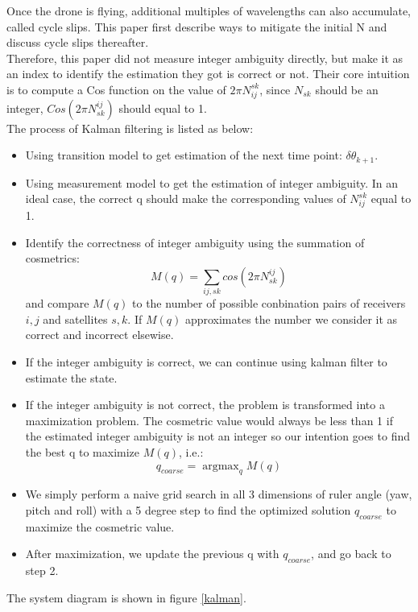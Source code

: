 \documentclass[journal,onecolumn]{IEEEtran}
\DeclareMathOperator*{\argmax}{argmax} %
\begin{document}
Once the drone is flying, additional multiples of wavelengths can also accumulate,
called cycle slips. This paper first describe ways to mitigate the initial N and
discuss cycle slips thereafter.\\
Therefore, this paper did not measure integer ambiguity directly, but make it as an index
to identify the estimation they got is correct or not. Their core intuition is
to compute a Cos function on the value of $2\pi N_{ij}^{sk}$,
since $N_{sk}$ should be an integer, $Cos(2\pi N_{sk}^{ij})$ should equal to 1.\\
The process of Kalman filtering is listed as below:
\begin{itemize}
\item Using transition model to get estimation of the next time point: $\delta \theta_{k+1}$.
\item Using measurement model to get the estimation of integer ambiguity.
In an ideal case, the correct q should make the corresponding values of $N_{ij}^{sk}$
equal to 1.
\item Identify the correctness of integer ambiguity using the summation of cosmetrics:
\begin{equation}
  M(q) = \sum_{ij,sk} cos(2\pi N_{sk}^{ij})
\end{equation}
and compare $M(q)$ to the number of possible conbination pairs of receivers $i,j$ and
satellites $s,k$. If $M(q)$ approximates the number we consider it as correct and incorrect
elsewise.
\item If the integer ambiguity is correct, we can continue using kalman filter
to estimate the state.
\item If the integer ambiguity is not correct, the problem is transformed into a
maximization problem. The cosmetric value would always be less than 1 if the estimated
integer ambiguity is not an integer so our intention goes to find the best q to maximize
$M(q)$, i.e.:
\begin{equation}
  q_{coarse} = \argmax_q M(q)
\end{equation}
\item We simply perform a naive grid search in all
3 dimensions of ruler angle (yaw, pitch and roll) with a 5 degree step to find the
optimized solution $q_{coarse}$ to maximize the cosmetric value.
\item After maximization, we update the previous q with $q_{coarse}$, and go back to step 2.
\end{itemize}
The system diagram is shown in figure \ref{kalman}.
\end{document}
